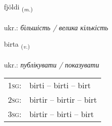 \documentclass[frontgrid, backgrid]{flacards}\usepackage[]{graphicx}\usepackage[]{xcolor}
\begin{document}
\renewcommand{\flhead}{\vskip5pt \fboxsep=0pt {\small\bfseries\footnotesize Nafnorð | іменник}}
\renewcommand{\fcfoot}{\vskip5pt \fboxsep=0pt \hspace{2pt}{\small\bfseries\footnotesize 1K}}

\renewcommand{\blhead}{\vskip5pt {\small\bfseries\footnotesize Nafnorð | іменник }}
\renewcommand{\bcfoot}{\vskip5pt \hspace{2pt}{\small\bfseries\footnotesize 1K}}


{fjöldi \small{\textsubscript{(\textit{m.})}} \\[1ex] %
\textphonetic{[fjœltɪ]} \\
ukr.: \emph{більшість / велика кількість} \\  [2ex]
\renewcommand*{\arraystretch}{0.8}
}

\renewcommand{\flhead}{\vskip5pt \fboxsep=0pt {\small\bfseries\footnotesize Sagnorð | дієслово}}
\renewcommand{\fcfoot}{\vskip5pt \fboxsep=0pt \hspace{2pt}{\small\bfseries\footnotesize 1K}}

\renewcommand{\blhead}{\vskip5pt {\small\bfseries\footnotesize Sagnorð | дієслово }}
\renewcommand{\bcfoot}{\vskip5pt \hspace{2pt}{\small\bfseries\footnotesize 1K}}


{birta \small{\textsubscript{(\textit{v.})}} \\[1ex] %
\textphonetic{[pɪr̥ta]} \\
ukr.: \emph{публікувати / показувати} \\  [2ex]
\renewcommand*{\arraystretch}{0.8}
\begin{tabular}{p{1cm}l}
\textsc{1sg}: & birti -- birti -- birt \\ 
\textsc{2sg}: & birtir -- birtir -- birt \\ 
\textsc{3sg}: & birtir -- birti -- birt \\ 
\end{tabular}
}
\end{document}
